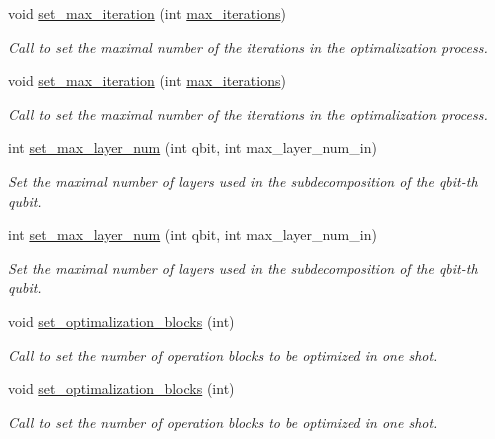 \begin{DoxyCompactItemize}
void \hyperlink{class_decomposition___base_a26e98bca148157ec42e5f1618deb50ea}{set\+\_\+max\+\_\+iteration} (int \hyperlink{class_decomposition___base_a89e74f075626c21e23228772bf8ad395}{max\+\_\+iterations})
\begin{DoxyCompactList}\small\item\em Call to set the maximal number of the iterations in the optimalization process. \end{DoxyCompactList}\item 
void \hyperlink{class_decomposition___base_a26e98bca148157ec42e5f1618deb50ea}{set\+\_\+max\+\_\+iteration} (int \hyperlink{class_decomposition___base_a89e74f075626c21e23228772bf8ad395}{max\+\_\+iterations})
\begin{DoxyCompactList}\small\item\em Call to set the maximal number of the iterations in the optimalization process. \end{DoxyCompactList}\item 
int \hyperlink{class_decomposition___base_a6cbee8cd37f42b2fe6bdd6f5c0fd3fdb}{set\+\_\+max\+\_\+layer\+\_\+num} (int qbit, int max\+\_\+layer\+\_\+num\+\_\+in)
\begin{DoxyCompactList}\small\item\em Set the maximal number of layers used in the subdecomposition of the qbit-\/th qubit. \end{DoxyCompactList}\item 
int \hyperlink{class_decomposition___base_a6cbee8cd37f42b2fe6bdd6f5c0fd3fdb}{set\+\_\+max\+\_\+layer\+\_\+num} (int qbit, int max\+\_\+layer\+\_\+num\+\_\+in)
\begin{DoxyCompactList}\small\item\em Set the maximal number of layers used in the subdecomposition of the qbit-\/th qubit. \end{DoxyCompactList}\item 
void \hyperlink{class_decomposition___base_af3b3574285055f66f4769f6398a84745}{set\+\_\+optimalization\+\_\+blocks} (int)
\begin{DoxyCompactList}\small\item\em Call to set the number of operation blocks to be optimized in one shot. \end{DoxyCompactList}\item 
void \hyperlink{class_decomposition___base_af3b3574285055f66f4769f6398a84745}{set\+\_\+optimalization\+\_\+blocks} (int)
\begin{DoxyCompactList}\small\item\em Call to set the number of operation blocks to be optimized in one shot. \end{DoxyCompactList}\item 

\end{DoxyCompactItemize}
